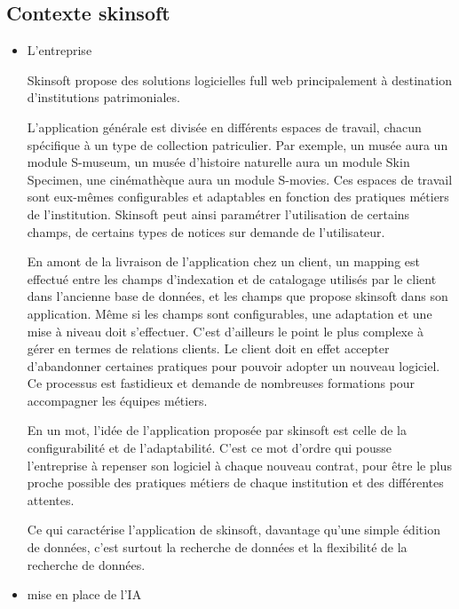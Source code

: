 \subsection{Contexte skinsoft}

\begin{itemize}
	
\item L'entreprise 
	
Skinsoft propose des solutions logicielles full web principalement à destination d'institutions patrimoniales. 

L'application générale est divisée en différents espaces de travail, chacun spécifique à un type de collection patriculier.  Par exemple, un musée aura un module S-museum, un musée d'histoire naturelle aura un module Skin Specimen, une cinémathèque aura un module S-movies. Ces espaces de travail sont eux-mêmes configurables et adaptables en fonction des pratiques métiers de l'institution. Skinsoft peut ainsi paramétrer l'utilisation de certains champs, de certains types de notices sur demande de l'utilisateur. 

En amont de la livraison de l'application chez un client, un mapping est effectué entre les champs d'indexation et de catalogage utilisés par le client dans l'ancienne base de données, et les champs que propose skinsoft dans son application. Même si les champs sont configurables, une adaptation et une mise à niveau doit s'effectuer. C'est d'ailleurs le point le plus complexe à gérer en termes de relations clients. Le client doit en effet accepter d'abandonner certaines pratiques pour pouvoir adopter un nouveau logiciel. Ce processus est fastidieux et demande de nombreuses formations pour accompagner les équipes métiers. 

En un mot, l'idée de l'application proposée par skinsoft est celle de la configurabilité et de l'adaptabilité. C'est ce mot d'ordre qui pousse l'entreprise à repenser son logiciel à chaque nouveau contrat, pour être le plus proche possible des pratiques métiers de chaque institution et des différentes attentes. 

Ce qui caractérise l'application de skinsoft, davantage qu'une simple édition de données, c'est surtout la recherche de données et la flexibilité de la recherche de données. 

\item mise en place de l'IA



\end{itemize}

